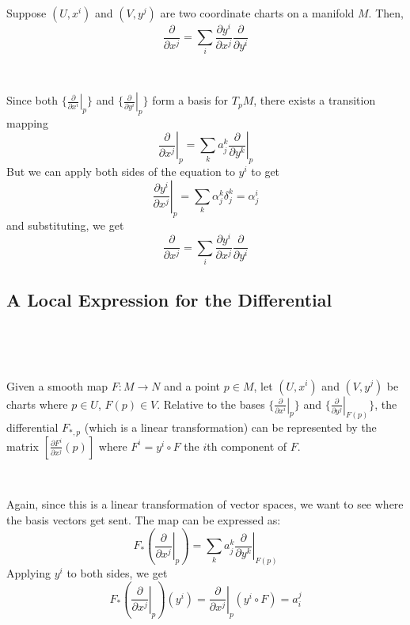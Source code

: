 \documentclass{article}
\begin{document}
\begin{proposition}
  \

  Suppose $(U, x^i)$ and $(V, y^j)$ are two coordinate charts on a manifold $M$. Then, $$\frac{\partial}{\partial x^j} = \sum_{i} \frac{\partial y^i}{\partial x^j} \frac{\partial}{\partial y^i}$$
\end{proposition}

\begin{customproof}
  \

  Since both $\{\left.\frac{\partial}{\partial x^i}\right\vert_p\}$ and $\{\left.\frac{\partial}{\partial y^i}\right\vert_p\}$ form a basis for $T_pM$, there exists a transition mapping $$\left.\frac{\partial}{\partial x^j}\right\vert_p = \sum_k a^k_j \left.\frac{\partial}{\partial y^k}\right\vert_p$$But we can apply both sides of the equation to $y^i$ to get $$\left.\frac{\partial y^i}{\partial x^j}\right\vert_p = \sum_k \alpha^k_j \delta^k_j = \alpha^i_j$$and substituting, we get$$\frac{\partial}{\partial x^j} = \sum_{i} \frac{\partial y^i}{\partial x^j} \frac{\partial}{\partial y^i}$$
\end{customproof}

\subsection{A Local Expression for the Differential}
\

\begin{proposition}
  \

  Given a smooth map $F: M\to N$ and a point $p \in M$, let $(U, x^i)$ and $(V, y^j)$ be charts where $p \in U$, $F(p) \in V$. Relative to the bases $\{\left.\frac{\partial}{\partial x^i}\right\vert_p\}$ and $\{\left.\frac{\partial}{\partial y^j}\right\vert_{F(p)}\}$, the differential $F_{*, p}$ (which is a linear transformation) can be represented by the matrix $[\frac{\partial F^i}{\partial x^j}(p)]$ where $F^i = y^i \circ F$ the $i$th component of $F$.
\end{proposition}

\begin{customproof}
  \

  Again, since this is a linear transformation of vector spaces, we want to see where the basis vectors get sent. The map can be expressed as: $$F_*(\left.\frac{\partial}{\partial x^j}\right\vert_{p}) = \sum_k a^k_j \left.\frac{\partial}{\partial y^k}\right\vert_{F(p)}$$Applying $y^i$ to both sides, we get $$F_*(\left.\frac{\partial}{\partial x^j}\right\vert_{p})(y^i) = \left.\frac{\partial}{\partial x^j}\right\vert_p (y^i \circ F) = a^j_i$$
\end{customproof}
\end{document}

